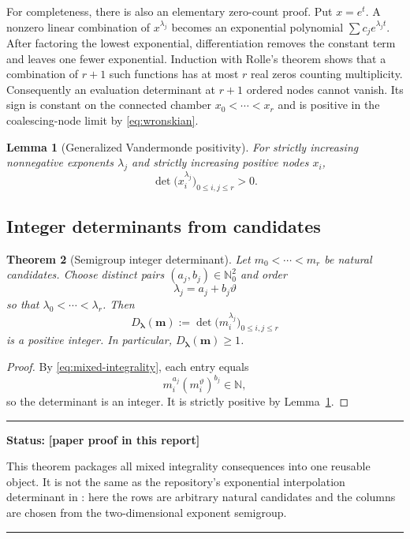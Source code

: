 \documentclass[11pt,oneside]{article}
\newtheorem{theorem}{Theorem}[section]
\newtheorem{lemma}[theorem]{Lemma}
\theoremstyle{definition}
\theoremstyle{remark}
\newcommand{\N}{\mathbb N}
\newcommand{\Nzero}{\mathbb N_0}
\newcommand{\thetaq}{\vartheta}
\newcommand{\statusnew}{\textcolor{newgreen}{\textbf{[paper proof in this report]}}}
\newenvironment{statusbox}[1]
{\begin{center}\begin{minipage}{0.94\textwidth}\raggedright\hbadness=10000\hrule\vspace{0.45em}\textbf{Status:} #1\par\vspace{0.35em}}
{\vspace{0.35em}\hrule\end{minipage}\end{center}}
\begin{document}
For completeness, there is also an elementary zero-count proof.  Put $x=e^t$.  A nonzero
linear combination of $x^{\lambda_j}$ becomes an exponential polynomial
$\sum c_je^{\lambda_jt}$.  After factoring the lowest exponential, differentiation removes
the constant term and leaves one fewer exponential.  Induction with Rolle's theorem shows
that a combination of $r+1$ such functions has at most $r$ real zeros counting multiplicity.
Consequently an evaluation determinant at $r+1$ ordered nodes cannot vanish.  Its sign is
constant on the connected chamber $x_0<\cdots<x_r$ and is positive in the coalescing-node
limit by \eqref{eq:wronskian}.

\begin{lemma}[Generalized Vandermonde positivity]
\label{lem:generalized-vandermonde}
For strictly increasing nonnegative exponents $\lambda_j$ and strictly increasing positive
nodes $x_i$,
\begin{equation}
 \det\bigl(x_i^{\lambda_j}\bigr)_{0\le i,j\le r}>0.
 \label{eq:gv-positive}
\end{equation}
\end{lemma}

\subsection{Integer determinants from candidates}

\begin{theorem}[Semigroup integer determinant]
\label{thm:semigroup-integer-det}
Let $m_0<\cdots<m_r$ be natural candidates.  Choose distinct pairs
$(a_j,b_j)\in\Nzero^2$ and order
\[
 \lambda_j=a_j+b_j\thetaq
\]
so that $\lambda_0<\cdots<\lambda_r$.  Then
\begin{equation}
 D_{\boldsymbol\lambda}(\boldsymbol m)
 :=\det\bigl(m_i^{\lambda_j}\bigr)_{0\le i,j\le r}
 \label{eq:semigroup-det}
\end{equation}
is a positive integer.  In particular, $D_{\boldsymbol\lambda}(\boldsymbol m)\ge1$.
\end{theorem}

\begin{proof}
By \eqref{eq:mixed-integrality}, each entry equals
\[
 m_i^{a_j}(m_i^{\thetaq})^{b_j}\in\N,
\]
so the determinant is an integer.  It is strictly positive by
Lemma~\ref{lem:generalized-vandermonde}.
\end{proof}

\begin{statusbox}{\statusnew}
This theorem packages all mixed integrality consequences into one reusable object.  It is
not the same as the repository's exponential interpolation determinant in
: here the rows are arbitrary natural candidates and the
columns are chosen from the two-dimensional exponent semigroup.
\end{statusbox}
\end{document}
